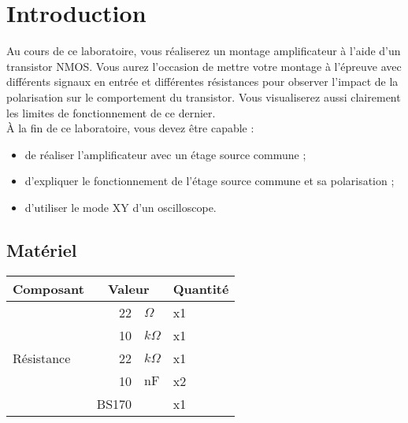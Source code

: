 \documentclass{../../template/labo}
\author{The Fantastic Four} %
\begin{document}




\section{Introduction}

Au cours de ce laboratoire, vous réaliserez un montage amplificateur à l'aide d'un transistor NMOS.
Vous aurez l'occasion de mettre votre montage à l'épreuve avec différents signaux en entrée et différentes résistances pour observer l'impact de la polarisation sur le comportement du transistor. Vous visualiserez aussi clairement les limites de fonctionnement de ce dernier.\\


À la fin de ce laboratoire, vous devez être capable :
\begin{itemize}
\item de réaliser l'amplificateur avec un étage source commune ;
\item d'expliquer le fonctionnement de l'étage source commune et sa polarisation ;
\item d'utiliser le mode XY d'un oscilloscope.
\end{itemize}

\subsection{Matériel}

\begin{center}
	\begin{tabular}{p{}rlp{}}
		Composant & \multicolumn{2}{c}{Valeur} & Quantité \\\toprule
		\multirow{5}{*}{Résistance} & 22 & $\Omega$ & x1 \\
									& 10 & $k\Omega$ & x1 \\
									& 22 & $k\Omega$ & x1 \\\midrule
		\multirow{1}{*}{Condensateur} 	& 10 & $\si{\nano\farad}$ & x2 \\\midrule
		Transistor & BS170 & & x1 \\\bottomrule
	\end{tabular}
	\end{center}
\clearpage
\end{document}
